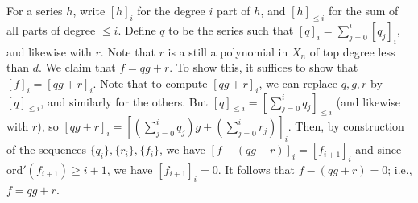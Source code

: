 \documentclass[12pt]{amsart}
\newcommand{\ord}{\mathrm{ord}}
\begin{document}
\begin{enumerate}
{\begin{enumerate}
For a series $h$, write $[h]_i$ for the degree $i$ part of $h$, and $[h]_{{\leq i}}$ for the sum of all parts of degree $\leq i$. Define $q$ to be the series such that $[q]_i = \sum_{j=0}^i [q_j]_i$, and likewise with $r$. Note that $r$ is a still a polynomial  in $X_n$ of top degree less than $d$. We claim that $f=qg+r$. To show this, it suffices to show that $[f]_i=[qg+r]_i$. Note that to compute $[qg+r]_i$, we can replace $q,g,r$ by $[q]_{\leq i}$, and similarly for the others. But $[q]_{\leq i}= [ \sum_{j=0}^i q_j ]_{\leq i}$ (and likewise with $r$), so $[qg+r]_i = [ (\sum_{j=0}^i q_j) g + (\sum_{j=0}^i r_j)]_i$. Then, by construction of the sequences $\{q_i\},\{r_i\}, \{f_i\}$, we have $[ f- (qg+r) ]_i = [f_{i+1}]_i$ and since $\ord'(f_{i+1}) \geq i+1$, we have $[f_{i+1}]_i=0$. It follows that $f- (qg+r)=0$; i.e., $f=qg+r$.
\end{enumerate}
}







\end{enumerate}


\vfill
\end{document}
